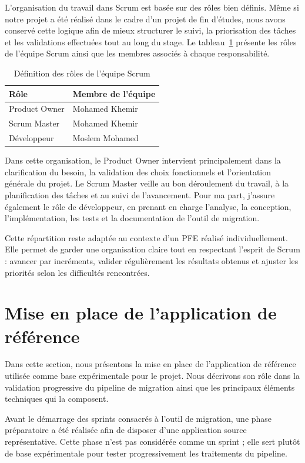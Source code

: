 L'organisation du travail dans Scrum est basée sur des rôles bien définis. Même si notre projet a été réalisé dans le cadre d'un projet de fin d'études, nous avons conservé cette logique afin de mieux structurer le suivi, la priorisation des tâches et les validations effectuées tout au long du stage. Le tableau~\ref{tab:equipe-scrum} présente les rôles de l'équipe Scrum ainsi que les membres associés à chaque responsabilité.

\begingroup
\renewcommand{\arraystretch}{1.35}
\begin{longtable}{|l|l|}
\caption{Définition des rôles de l'équipe Scrum}\label{tab:equipe-scrum}\\
\hline
\textbf{Rôle} & \textbf{Membre de l'équipe} \\
\hline
Product Owner & Mohamed Khemir \\
\hline
Scrum Master & Mohamed Khemir \\
\hline
Développeur & Moslem Mohamed \\
\hline
\end{longtable}
\endgroup

Dans cette organisation, le Product Owner intervient principalement dans la clarification du besoin, la validation des choix fonctionnels et l'orientation générale du projet. Le Scrum Master veille au bon déroulement du travail, à la planification des tâches et au suivi de l'avancement. Pour ma part, j'assure également le rôle de développeur, en prenant en charge l'analyse, la conception, l'implémentation, les tests et la documentation de l'outil de migration.

Cette répartition reste adaptée au contexte d'un PFE réalisé individuellement. Elle permet de garder une organisation claire tout en respectant l'esprit de Scrum : avancer par incréments, valider régulièrement les résultats obtenus et ajuster les priorités selon les difficultés rencontrées.

\section{Mise en place de l'application de référence}

Dans cette section, nous présentons la mise en place de l'application de référence utilisée comme base expérimentale pour le projet. Nous décrivons son rôle dans la validation progressive du pipeline de migration ainsi que les principaux éléments techniques qui la composent.

Avant le démarrage des sprints consacrés à l'outil de migration, une phase préparatoire a été réalisée afin de disposer d'une application source représentative. Cette phase n'est pas considérée comme un sprint ; elle sert plutôt de base expérimentale pour tester progressivement les traitements du pipeline.

